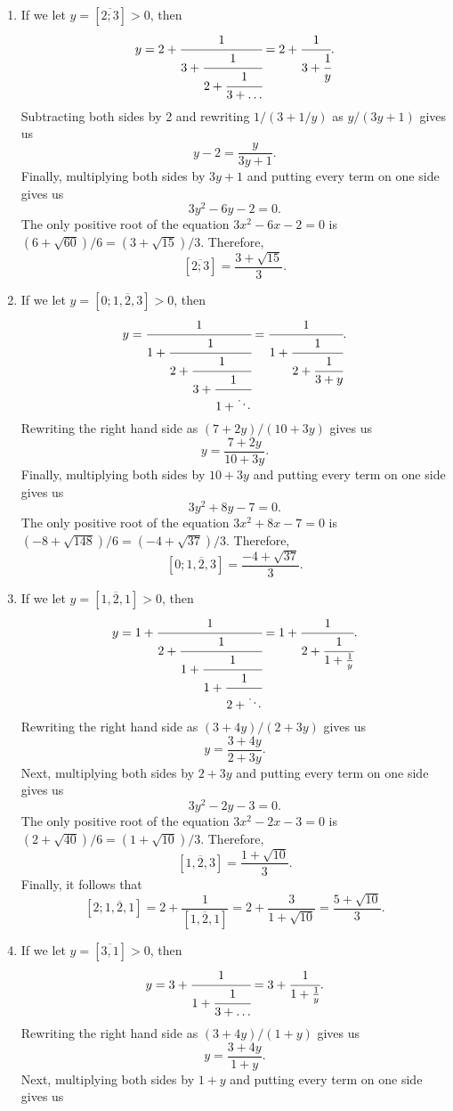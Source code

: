 \begin{solution}
    \begin{enumerate}
        \item If we let $y = [\overline{2; 3}] > 0$, then
        $$y = 2 + \cfrac{1}{3 + \cfrac{1}{2 + \cfrac{1}{3 + \dots}}} = 2 + \cfrac{1}{3 + \cfrac{1}{y}}.$$
        Subtracting both sides by 2 and rewriting $1/(3 + 1/y)$ as $y/(3y + 1)$ gives us
        $$y-2 = \frac{y}{3y + 1}.$$
        Finally, multiplying both sides by $3y + 1$ and putting every term on one side gives us
        $$3y^2 - 6y - 2 = 0.$$
        The only positive root of the equation $3x^2 - 6x - 2 = 0$ is $(6 + \sqrt{60})/6 = (3 + \sqrt{15})/3$. Therefore, 
        $$[\overline{2; 3}] = \frac{3 + \sqrt{15}}{3}.$$
        \item If we let $y = [0; \overline{1, 2, 3}] > 0$, then
        $$y = \cfrac{1}{1 + \cfrac{1}{2 + \cfrac{1}{3 + \cfrac{1}{1 + \ddots}}}} = \cfrac{1}{1 + \cfrac{1}{2 + \cfrac{1}{3 + y}}}.$$
        Rewriting the right hand side as $(7 + 2y)/(10 + 3y)$ gives us
        $$y = \frac{7 + 2y}{10 + 3y}.$$
        Finally, multiplying both sides by $10 + 3y$ and putting every term on one side gives us
        $$3y^2 + 8y - 7 = 0.$$
        The only positive root of the equation $3x^2 + 8x - 7 = 0$ is $(-8 + \sqrt{148})/6 = (-4 + \sqrt{37})/3$. Therefore, 
        $$[0; \overline{1, 2, 3}] = \frac{-4 + \sqrt{37}}{3}.$$
        \item If we let $y = [\overline{1, 2, 1}] > 0$, then
        $$y = 1 + \cfrac{1}{2 + \cfrac{1}{1 + \cfrac{1}{1 + \cfrac{1}{2 + \ddots}}}} = 1 + \cfrac{1}{2 + \cfrac{1}{1 + \frac{1}{y}}}.$$
        Rewriting the right hand side as $(3 + 4y)/(2 + 3y)$ gives us
        $$y = \frac{3 + 4y}{2 + 3y}.$$
        Next, multiplying both sides by $2 + 3y$ and putting every term on one side gives us
        $$3y^2 - 2y - 3 = 0.$$
        The only positive root of the equation $3x^2 - 2x - 3 = 0$ is $(2 + \sqrt{40})/6 = (1 + \sqrt{10})/3$. Therefore, 
        $$[\overline{1, 2, 3}] = \frac{1 + \sqrt{10}}{3}.$$
        Finally, it follows that
        $$[2; \overline{1, 2, 1}] = 2 + \frac{1}{[\overline{1, 2, 1}]} = 2 + \frac{3}{1 + \sqrt{10}} = \frac{5 + \sqrt{10}}{3}.$$
        \item If we let $y = [\overline{3, 1}] > 0$, then
        $$y = 3 + \cfrac{1}{1 + \cfrac{1}{3 + \dots}} = 3 + \cfrac{1}{1 + \frac{1}{y}}.$$
        Rewriting the right hand side as $(3 + 4y)/(1 + y)$ gives us
        $$y = \frac{3 + 4y}{1 + y}.$$
        Next, multiplying both sides by $1 + y$ and putting every term on one side gives us

\end{enumerate}
\end{solution}
